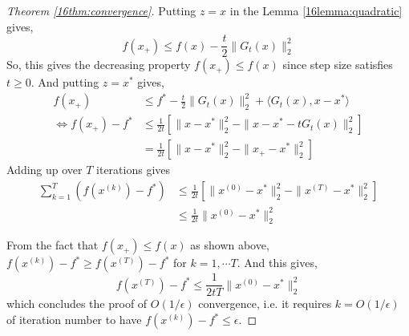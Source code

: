 \documentclass[12pt]{report}
\begin{document}
\begin{proof}[Theorem \ref{16thm:convergence}]
Putting $z=x$ in the Lemma \ref{16lemma:quadratic} gives,
\begin{equation*}
f(x_+) \leq f(x)-\frac{t}{2}\|G_t (x)\|_2^2
\end{equation*}
So, this gives the decreasing property $f(x_+) \leq f(x)$ since step size satisfies $t \geq 0$. 
And putting $z=x^*$ gives,
\begin{align*}
f(x_+) &\leq f^*-\frac{t}{2}\|G_t (x)\|_2^2+\langle G_t (x),x-x^* \rangle\\
\Leftrightarrow f(x_+)-f^* &\leq \frac{1}{2t}\left[ \|x-x^* \|_2^2 - \|x-x^*-tG_t(x)\|_2^2 \right]\\
&=\frac{1}{2t}\left[ \|x-x^* \|_2^2 - \|x_+ -x^*\|_2^2 \right]
\end{align*}
Adding up over $T$ iterations gives
\begin{align*}
\sum_{k=1}^{T}\left(f(x^{(k)})-f^* \right) &\leq \frac{1}{2t} \left[\|x^{(0)}-x^*\|_2^2 - \|x^{(T)}-x^*\|_2^2\right] \\
&\leq \frac{1}{2t}\|x^{(0)}-x^*\|_2^2
\end{align*}

From the fact that $f(x_+) \leq f(x)$ as shown above, $f(x^{(k)})-f^* \geq f(x^{(T)})-f^*$ for $k=1,\cdots T$. And this gives,
\begin{equation*}
f(x^{(T)})-f^* \leq \frac{1}{2tT} \|x^{(0)}-x^*\|_2^2
\end{equation*}
which concludes the proof of $O(1/\epsilon)$ convergence, i.e. it requires $k= O(1/\epsilon)$ of iteration number to have $f(x^{(k)})-f^* \leq \epsilon$.

\end{proof}
\end{document}
